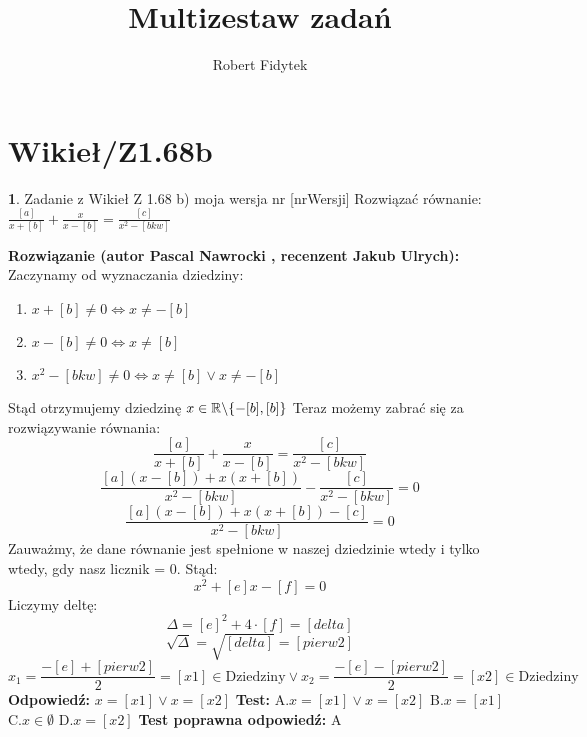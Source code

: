 \documentclass[12pt, a4paper]{article}
\title{Multizestaw zadań}
\author{Robert Fidytek}
\date{}
\theoremstyle{definition} %
\newtheorem{zad}{}
\newcommand{\kategoria}[1]{\section{#1}} %
\newcommand{\zadStart}[1]{\begin{zad}#1\newline} %
\newcommand{\zadStop}{\end{zad}}   %
\newcommand{\rozwStart}[2]{\noindent \textbf{Rozwiązanie (autor #1 , recenzent #2): }\newline} %
\newcommand{\odpStart}{\noindent \textbf{Odpowiedź:}\newline}    %
\newcommand{\odpStop}{\newline}                                             %
\newcommand{\testStart}{\noindent \textbf{Test:}\newline} %
\newcommand{\testStop}{\newline} %
\newcommand{\kluczStart}{\noindent \textbf{Test poprawna odpowiedź:}\newline} %
\newcommand{\kluczStop}{\newline} %
\begin{document}
\maketitle


\kategoria{Wikieł/Z1.68b}
\zadStart{Zadanie z Wikieł Z 1.68 b) moja wersja nr [nrWersji]}
Rozwiązać równanie: $\frac{[a]}{x+[b]}+\frac{x}{x-[b]}=\frac{[c]}{x^2-[bkw]}$
\zadStop
\rozwStart{Pascal Nawrocki}{Jakub Ulrych}
Zaczynamy od wyznaczania dziedziny:
\begin{enumerate}
\item $x+[b]\neq0 \Leftrightarrow x\neq-[b]$
\item $x-[b] \neq0 \Leftrightarrow x\neq[b]$
\item $x^2-[bkw]\neq0 \Leftrightarrow x\neq[b] \vee x\neq-[b]$
\end{enumerate}
Stąd otrzymujemy dziedzinę $x\in\mathbb{R}\symbol{92}\{-[b],[b]\}$
Teraz możemy zabrać się za rozwiązywanie równania:
$$\frac{[a]}{x+[b]}+\frac{x}{x-[b]}=\frac{[c]}{x^2-[bkw]}$$
$$\frac{[a](x-[b])+x(x+[b])}{x^2-[bkw]}-\frac{[c]}{x^2-[bkw]}=0$$
$$\frac{[a](x-[b])+x(x+[b])-[c]}{x^2-[bkw]}=0$$
Zauważmy, że dane równanie jest spełnione w naszej dziedzinie wtedy i tylko wtedy, gdy nasz licznik = 0. Stąd:
$$x^2+[e]x-[f]=0$$
Liczymy deltę:
$$\Delta=[e]^2+4\cdot[f]=[delta]$$
$$\sqrt{\Delta}=\sqrt{[delta]}=[pierw2]$$
$$x_1=\frac{-[e]+[pierw2]}{2}=[x1]\in\text{Dziedziny} \vee x_2=\frac{-[e]-[pierw2]}{2}=[x2]\in\text{Dziedziny}$$
\odpStart
$x=[x1] \vee x=[x2]$
\odpStop
\testStart
A.$x=[x1] \vee x=[x2]$
B.$x=[x1]$
C.$x\in\emptyset$
D.$x=[x2]$
\testStop
\kluczStart
A
\kluczStop
\end{document}
